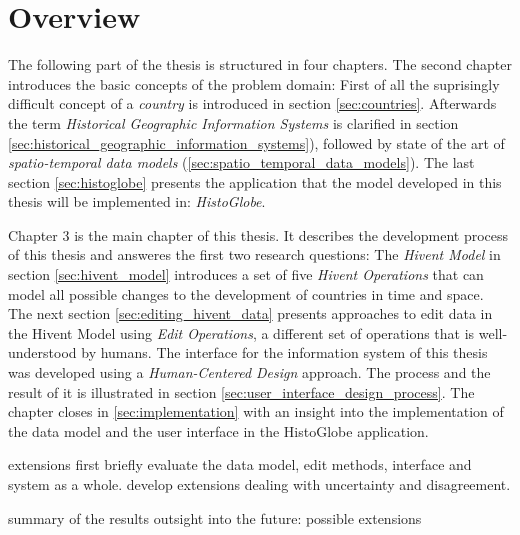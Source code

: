 \section{Overview} %
\label{sec:overview}

The following part of the thesis is structured in four chapters. The second chapter introduces the basic concepts of the problem domain: First of all the suprisingly difficult concept of a \emph{country} is introduced in section \ref{sec:countries}. Afterwards the term \emph{Historical Geographic Information Systems} is clarified in section \ref{sec:historical_geographic_information_systems}), followed by state of the art of \emph{spatio-temporal data models} (\ref{sec:spatio_temporal_data_models}). The last section \ref{sec:histoglobe} presents the application that the model developed in this thesis will be implemented in: \emph{HistoGlobe}.

Chapter 3 is the main chapter of this thesis. It describes the development process of this thesis and answeres the first two research questions: The \emph{Hivent Model} in section \ref{sec:hivent_model} introduces a set of five \emph{Hivent Operations} that can model all possible changes to the development of countries in time and space. The next section \ref{sec:editing_hivent_data} presents approaches to edit data in the Hivent Model using \emph{Edit Operations}, a different set of operations that is well-understood by humans. The interface for the information system of this thesis was developed using a \emph{Human-Centered Design} approach. The process and the result of it is illustrated in section \ref{sec:user_interface_design_process}. The chapter closes in \ref{sec:implementation} with an insight into the implementation of the data model and the user interface in the HistoGlobe application.

extensions
first briefly evaluate the data model, edit methods, interface and system as a whole.
develop extensions dealing with uncertainty and disagreement.

summary of the results
outsight into the future: possible extensions



